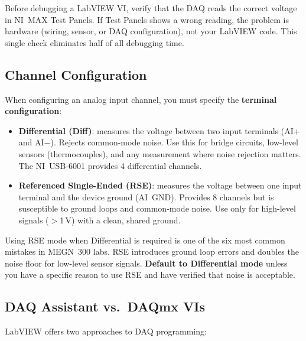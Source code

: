 \begin{warningbox}
Before debugging a LabVIEW VI, verify that the DAQ reads the correct voltage in NI~MAX Test Panels. If Test Panels shows a wrong reading, the problem is hardware (wiring, sensor, or DAQ configuration), not your LabVIEW code. This single check eliminates half of all debugging time.
\end{warningbox}

\subsection{Channel Configuration}

When configuring an analog input channel, you must specify the \textbf{terminal configuration}:

\begin{itemize}[leftmargin=1.5em]
\item \textbf{Differential (Diff)}: measures the voltage between two input terminals (AI+ and AI$-$). Rejects common-mode noise. Use this for bridge circuits, low-level sensors (thermocouples), and any measurement where noise rejection matters. The NI~USB-6001 provides 4 differential channels.
\item \textbf{Referenced Single-Ended (RSE)}: measures the voltage between one input terminal and the device ground (AI~GND). Provides 8 channels but is susceptible to ground loops and common-mode noise. Use only for high-level signals ($>$1\,V) with a clean, shared ground.
\end{itemize}

\begin{warningbox}
Using RSE mode when Differential is required is one of the six most common mistakes in MEGN~300 labs. RSE introduces ground loop errors and doubles the noise floor for low-level sensor signals. \textbf{Default to Differential mode} unless you have a specific reason to use RSE and have verified that noise is acceptable.
\end{warningbox}

\subsection{DAQ Assistant vs.\ DAQmx VIs}

LabVIEW offers two approaches to DAQ programming:

